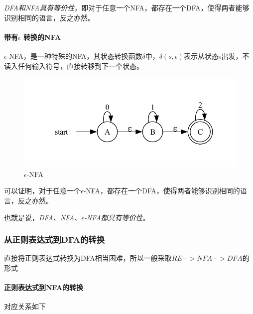 \documentclass[UTF8]{ctexart} %
\begin{document}
\emph{DFA和NFA具有等价性}，即对于任意一个NFA，都存在一个DFA，使得两者能够识别相同的语言，反之亦然。

\paragraph{带有$\epsilon$ 转换的NFA} $\epsilon$-NFA，是一种特殊的NFA，其状态转换函数$\delta$中，$\delta(s,\epsilon)$表示从状态s出发，不读入任何输入符号，直接转移到下一个状态。

\begin{figure}[H]
    \centering
    \includegraphics[width=\textwidth]{assets/epsilon-NFA.pdf}
    \caption{$\epsilon$-NFA}
\end{figure}

可以证明，对于任意一个$\epsilon$-NFA，都存在一个DFA，使得两者能够识别相同的语言，反之亦然。

也就是说，\emph{DFA、NFA、$\epsilon$-NFA都具有等价性}。

\subsubsection{从正则表达式到DFA的转换}

直接将正则表达式转换为DFA相当困难，所以一般采取$RE->NFA->DFA$的形式

\paragraph{正则表达式到NFA的转换} 对应关系如下
\end{document}
